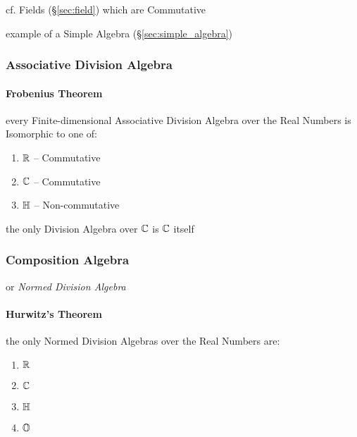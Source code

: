 cf. Fields (\S\ref{sec:field}) which are Commutative

example of a Simple Algebra (\S\ref{sec:simple_algebra})



\subsubsection{Associative Division Algebra}
\label{sec:associative_division_algebra}

\paragraph{Frobenius Theorem}\label{sec:frobenius_theorem}\hfill

every Finite-dimensional Associative Division Algebra over the Real Numbers is
Isomorphic to one of:
\begin{enumerate}
  \item $\mathbb{R}$ -- Commutative
  \item $\mathbb{C}$ -- Commutative
  \item $\mathbb{H}$ -- Non-commutative
\end{enumerate}

the only Division Algebra over $\mathbb{C}$ is $\mathbb{C}$ itself



\subsubsection{Composition Algebra}\label{sec:composition_algebra}

or \emph{Normed Division Algebra}



\paragraph{Hurwitz's Theorem}\label{sec:hurwitzs_theorem}\hfill

the only Normed Division Algebras over the Real Numbers are:
\begin{enumerate}
  \item $\mathbb{R}$
  \item $\mathbb{C}$
  \item $\mathbb{H}$
  \item $\mathbb{O}$
\end{enumerate}



